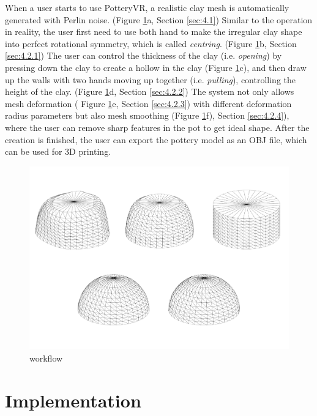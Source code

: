When a user starts to use PotteryVR, a realistic clay mesh is automatically generated with Perlin noise. (Figure \ref{fig:2}a, Section \ref{sec:4.1})
Similar to the operation in reality, the user first need to use both hand to make the irregular clay shape into perfect rotational symmetry, which is called \textit{centring}. (Figure \ref{fig:2}b, Section \ref{sec:4.2.1})
The user can control the thickness of the clay (i.e. \textit{opening}) by pressing down the clay to create a hollow in the clay (Figure \ref{fig:2}c), 
and then draw up the walls with two hands moving up together (i.e. \textit{pulling}), controlling the height of the clay. (Figure \ref{fig:2}d, Section \ref{sec:4.2.2})
The system not only allows mesh deformation ( Figure \ref{fig:2}e, Section \ref{sec:4.2.3}) with different deformation radius parameters but also mesh smoothing (Figure \ref{fig:2}f), Section \ref{sec:4.2.4}), where the user can remove sharp features in the pot to get ideal shape.
After the creation is finished, the user can export the pottery model as an OBJ file, which can be used for 3D printing.
\begin{figure}
  \includegraphics[width=\textwidth]{fig2.pdf}
\caption{workflow}
\label{fig:2}       %
\end{figure}


\section{Implementation}
\label{sec:4}

